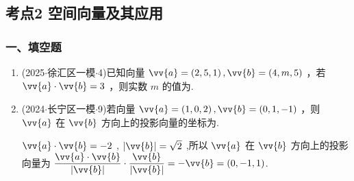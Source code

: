 \subsection*{考点2 空间向量及其应用}

\subsubsection*{一、填空题}
\begin{enumerate}
    \item (2025$\cdot$徐汇区一模$\cdot$4)已知向量 $\vv{a} = \left( {2,5,1}\right) ,\vv{b} = \left( {4,m,5}\right)$ ，若 $\vv{a} \cdot  \vv{b} = 3$ ，则实数 $m$ 的值为.

    \item (2024$\cdot$长宁区一模$\cdot$9)若向量 $\vv{a} = \left( {1,0,2}\right) ,\vv{b} = \left( {0,1, - 1}\right)$ ，则 $\vv{a}$ 在 $\vv{b}$ 方向上的投影向量的坐标为.
\begin{jieda}
    $\vv{a} \cdot  \vv{b} =  - 2$ , $\left| \vv{b}\right|  = \sqrt{2}$ ,所以 $\vv{a}$ 在 $\vv{b}$ 方向上的投影向量为 $\dfrac{\vv{a} \cdot  \vv{b}}{\left| \vv{b}\right| } \cdot  \dfrac{\vv{b}}{\left| \vv{b}\right| } =  - \vv{b} = \left( {0, - 1,1}\right)$.
\end{jieda}


\end{enumerate}
